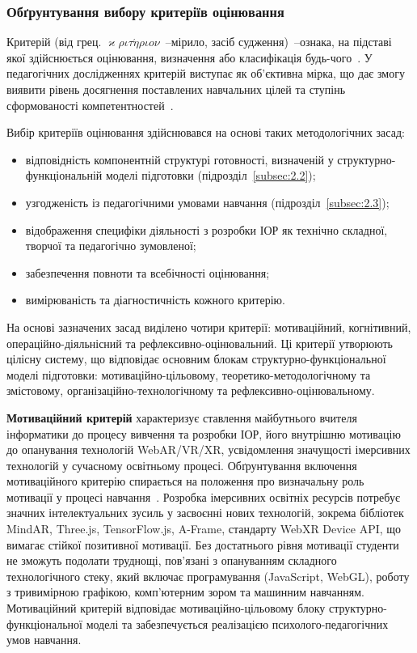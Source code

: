 \subsubsection{Обґрунтування вибору критеріїв оцінювання}

Критерій (від грец. $\varkappa\rho\iota\tau\acute{\eta}\rho\iota o\nu$~--мірило, засіб судження)~--ознака, на підставі якої здійснюється оцінювання, визначення або класифікація будь-чого~\cite{Goncharenko1997Dictionary}. У педагогічних дослідженнях критерій виступає як об'єктивна мірка, що дає змогу виявити рівень досягнення поставлених навчальних цілей та ступінь сформованості компетентностей~\cite{Goncharenko2011Pedagogy}.

Вибір критеріїв оцінювання здійснювався на основі таких методологічних засад:
\begin{itemize}
\item відповідність компонентній структурі готовності, визначеній у структурно-функціональній моделі підготовки (підрозділ~\ref{subsec:2.2});
\item узгодженість із педагогічними умовами навчання (підрозділ~\ref{subsec:2.3});
\item відображення специфіки діяльності з розробки ІОР як технічно складної, творчої та педагогічно зумовленої;
\item забезпечення повноти та всебічності оцінювання;
\item вимірюваність та діагностичність кожного критерію.
\end{itemize}

На основі зазначених засад виділено чотири критерії: мотиваційний, когнітивний, операційно-діяльнісний та рефлексивно-оцінювальний. Ці критерії утворюють цілісну систему, що відповідає основним блокам структурно-функціональної моделі підготовки: мотиваційно-цільовому, теоретико-методологічному та змістовому, організаційно-технологічному та рефлексивно-оцінювальному.

\textbf{Мотиваційний критерій} характеризує ставлення майбутнього вчителя інформатики до процесу вивчення та розробки ІОР, його внутрішню мотивацію до опанування технологій WebAR/VR/XR, усвідомлення значущості імерсивних технологій у сучасному освітньому процесі. Обґрунтування включення мотиваційного критерію спирається на положення про визначальну роль мотивації у процесі навчання~\cite{Ziaziun2000Philosophy}. Розробка імерсивних освітніх ресурсів потребує значних інтелектуальних зусиль у засвоєнні нових технологій, зокрема бібліотек MindAR, Three.js, TensorFlow.js, A-Frame, стандарту WebXR Device API, що вимагає стійкої позитивної мотивації. Без достатнього рівня мотивації студенти не зможуть подолати труднощі, пов'язані з опануванням складного технологічного стеку, який включає програмування (JavaScript, WebGL), роботу з тривимірною графікою, комп'ютерним зором та машинним навчанням. Мотиваційний критерій відповідає мотиваційно-цільовому блоку структурно-функціональної моделі та забезпечується реалізацією психолого-педагогічних умов навчання.

